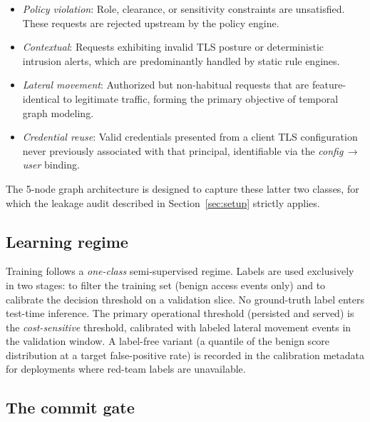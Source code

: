 \begin{itemize}
  \item \textit{Policy violation}: Role, clearance, or sensitivity constraints are unsatisfied.
  These requests are rejected upstream by the policy engine.
  \item \textit{Contextual}: Requests exhibiting invalid TLS posture or deterministic
  intrusion alerts, which are predominantly handled by static rule engines.
  \item \textit{Lateral movement}: Authorized but non-habitual requests that are feature-identical
  to legitimate traffic, forming the primary objective of temporal graph modeling.
  \item \textit{Credential reuse}: Valid credentials presented from a client TLS configuration
  never previously associated with that principal, identifiable via the
  \textit{config}\,$\rightarrow$\,\textit{user} binding.
\end{itemize}

The 5-node graph architecture is designed to capture these latter two classes, for which
the leakage audit described in Section~\ref{sec:setup} strictly applies.

\subsection{Learning regime}

Training follows a \textit{one-class} semi-supervised regime. Labels are used exclusively
in two stages: to filter the training set (benign access events only) and to calibrate the
decision threshold on a validation slice. No ground-truth label enters test-time inference.
The primary operational threshold (persisted and served) is the \textit{cost-sensitive}
threshold, calibrated with labeled lateral movement events in the validation window. A
label-free variant (a quantile of the benign score distribution at a target false-positive
rate) is recorded in the calibration metadata for deployments where red-team labels are
unavailable.

\subsection{The commit gate}

